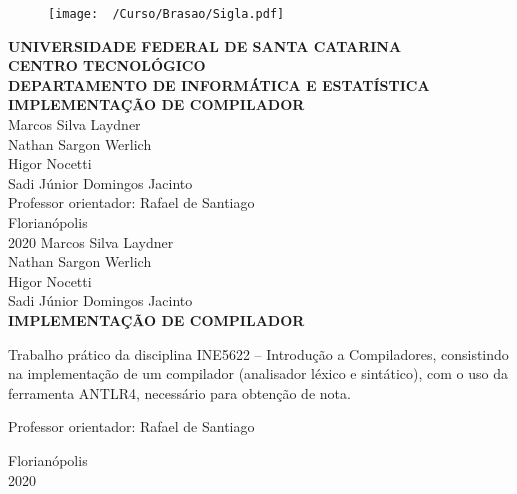\documentclass[12pt,a4paper,brazil,abntex2]{article}
\begin{document}
\singlespacing
\begin{titlepage}
\begin{center}
\begin{figure}[!htb]
\center

\texttt{[image: ~/Curso/Brasao/Sigla.pdf]} 

\end{figure}
{\bf  UNIVERSIDADE FEDERAL DE SANTA CATARINA}\\[0.2cm] %
{\bf CENTRO TECNOLÓGICO}\\[0.2cm] %
{\bf  DEPARTAMENTO DE INFORMÁTICA E ESTATÍSTICA}\\[5.5cm]
{\bf \large IMPLEMENTAÇÃO DE COMPILADOR}\\[3.8cm] %
{Marcos Silva Laydner}\\
{Nathan Sargon Werlich}\\
{Higor Nocetti}\\
{Sadi Júnior Domingos Jacinto}\\[0.7cm] %
{Professor orientador: Rafael de Santiago}\\[4cm]
{Florianópolis}\\[0.2cm]
{2020}
\newpage
\thispagestyle{empty}
{Marcos Silva Laydner}\\
{Nathan Sargon Werlich}\\
{Higor Nocetti}\\
{Sadi Júnior Domingos Jacinto}\\[9cm] %
{\bf \large IMPLEMENTAÇÃO DE COMPILADOR}\\[0.5cm]
    \begin{flushright}
    \begin{list}{}{
      \setlength{\leftmargin}{7.2cm}
      \setlength{\rightmargin}{0cm}
      \setlength{\labelwidth}{0pt}
      \setlength{\labelsep}{\leftmargin}}
      \item Trabalho prático da disciplina INE5622 – Introdução a Compiladores, consistindo na implementação de um compilador (analisador léxico e sintático), com o uso da ferramenta ANTLR4, necessário para obtenção de nota.\\[0.2 cm] 
      \setlength{\labelsep}{\leftmargin}
      \item Professor orientador: Rafael de Santiago\
      \\[8.2cm]
     \end{list}
	 \end{flushright}
{Florianópolis}\\[0.2cm]
{2020}
\end{center}
\end{titlepage} %
\newpage
\thispagestyle{empty}
\begin{center}
\tableofcontents
\end{center}




\end{document}
